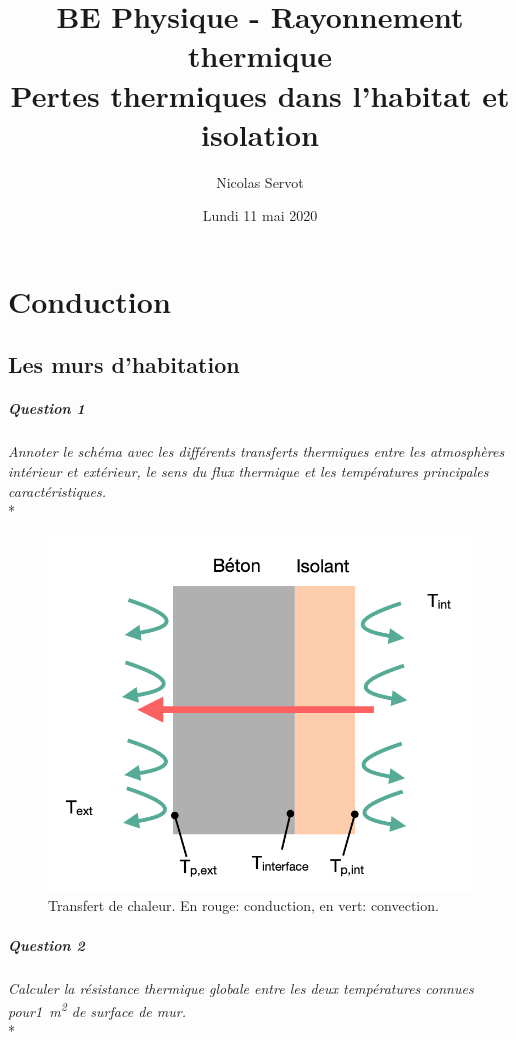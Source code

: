 \documentclass[oneside,a4paper,13pt]{book}
\begin{document}
\title{%
	BE Physique - Rayonnement thermique \\
	\large Pertes thermiques dans l'habitat et isolation}
	
\author{Nicolas Servot}
\date{Lundi 11 mai 2020}

\maketitle
\tableofcontents

\chapter{Conduction}
\section{Les murs d'habitation}

\paragraph{Question 1} 
\textit{Annoter le schéma avec les différents transferts thermiques entre les atmosphères intérieur et extérieur, le sens du flux thermique et les températures principales caractéristiques.} \\* 

\begin{figure}[h!]
\centering
  \includegraphics[width=0.5\linewidth]{q1.png}
  \caption{Transfert de chaleur. En rouge: conduction, en vert: convection.}
  \label{fig:q1}
\end{figure}

\paragraph{Question 2} 
\textit{Calculer la résistance thermique globale entre les deux températures connues pour\SI{1}{ \meter\squared} de surface de mur.} \\* 
\end{document}
